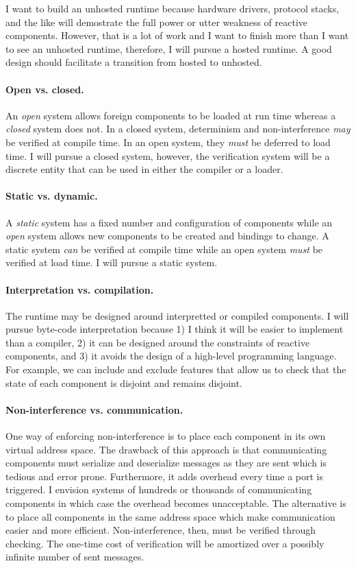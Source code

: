 I want to build an unhosted runtime because hardware drivers, protocol stacks, and the like will demostrate the full power or utter weakness of reactive components.
However, that is a lot of work and I want to finish more than I want to see an unhosted runtime, therefore, I will pursue a hosted runtime.
A good design should facilitate a transition from hosted to unhosted.

\paragraph{Open vs. closed.}
An \emph{open} system allows foreign components to be loaded at run time whereas a \emph{closed} system does not.
In a closed system, determinism and non-interference \emph{may} be verified at compile time.
In an open system, they \emph{must} be deferred to load time.
I will pursue a closed system, however, the verification system will be a discrete entity that can be used in either the compiler or a loader.

\paragraph{Static vs. dynamic.}
A \emph{static} system has a fixed number and configuration of components while an \emph{open} system allows new components to be created and bindings to change.
A static system \emph{can} be verified at compile time while an open system \emph{must} be verified at load time.
I will pursue a static system.

\paragraph{Interpretation vs. compilation.}
The runtime may be designed around interpretted or compiled components.
I will pursue byte-code interpretation because 1) I think it will be easier to implement than a compiler, 2) it can be designed around the constraints of reactive components, and 3) it avoids the design of a high-level programming language.
For example, we can include and exclude features that allow us to check that the state of each component is disjoint and remains disjoint.

\paragraph{Non-interference vs. communication.}
One way of enforcing non-interference is to place each component in its own virtual address space.
The drawback of this approach is that communicating components must serialize and deserialize messages as they are sent which is tedious and error prone.
Furthermore, it adds overhead every time a port is triggered.
I envision systems of hundreds or thousands of communicating components in which case the overhead becomes unacceptable.
The alternative is to place all components in the same address space which make communication easier and more efficient.
Non-interference, then, must be verified through checking.
The one-time cost of verification will be amortized over a possibly infinite number of sent messages.

